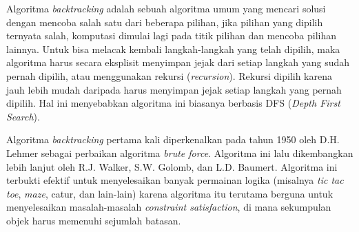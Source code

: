 Algoritma \textit{backtracking} adalah sebuah algoritma umum yang mencari solusi dengan mencoba salah satu dari beberapa pilihan, jika pilihan yang dipilih ternyata salah, komputasi dimulai lagi pada titik pilihan dan mencoba pilihan lainnya. Untuk bisa melacak kembali langkah-langkah yang telah dipilih, maka algoritma harus secara eksplisit menyimpan jejak dari setiap langkah yang sudah pernah dipilih, atau menggunakan rekursi (\textit{recursion}). Rekursi dipilih karena jauh lebih mudah daripada harus menyimpan jejak setiap langkah yang pernah dipilih. Hal ini menyebabkan algoritma ini biasanya berbasis DFS (\textit{Depth First Search}).

Algoritma \textit{backtracking} pertama kali diperkenalkan pada tahun 1950 oleh D.H. Lehmer sebagai perbaikan algoritma \textit{brute force}. Algoritma ini lalu dikembangkan lebih lanjut oleh R.J. Walker, S.W. Golomb, dan L.D. Baumert. Algoritma ini terbukti efektif untuk menyelesaikan banyak permainan logika (misalnya \textit{tic tac toe}, \textit{maze}, catur, dan lain-lain) karena algoritma itu terutama berguna untuk menyelesaikan masalah-masalah \textit{constraint satisfaction}, di mana sekumpulan objek harus memenuhi sejumlah batasan.

